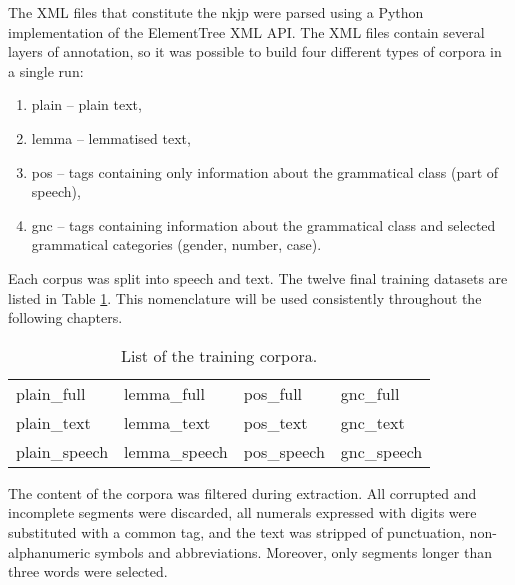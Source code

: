 The XML files that constitute the \gls{nkjp} were parsed using a Python implementation of the ElementTree XML API. The XML files contain several layers of annotation, so it was possible to build four different types of corpora in a single run:

\begin{enumerate}
	\item plain -- plain text,
	\item lemma -- lemmatised text, 
	\item pos -- tags containing only information about the grammatical class (part of speech),
	\item gnc -- tags containing information about the grammatical class and selected grammatical categories (gender, number, case).
\end{enumerate}

Each corpus was split into speech and text. The twelve final training datasets are listed in Table \ref{table:datasets}. This nomenclature will be used consistently throughout the following chapters. 

\begin{table}[!htbp]
	\centering
	\caption{List of the training corpora.}
	\begin{tabular*}{.6\linewidth}{@{\extracolsep{\fill}}llll}
	\label{table:datasets}
		plain_full   & lemma_full   & pos_full   & gnc_full \\ 
		plain_text   & lemma_text   & pos_text   & gnc_text \\
		plain_speech & lemma_speech & pos_speech & gnc_speech \\ 
	\end{tabular*}
\end{table}

The content of the corpora was filtered during extraction. All corrupted and incomplete segments were discarded, all numerals expressed with digits were substituted with a common tag, and the text was stripped of punctuation, non-alphanumeric symbols and abbreviations. Moreover, only segments longer than three words were selected. 

